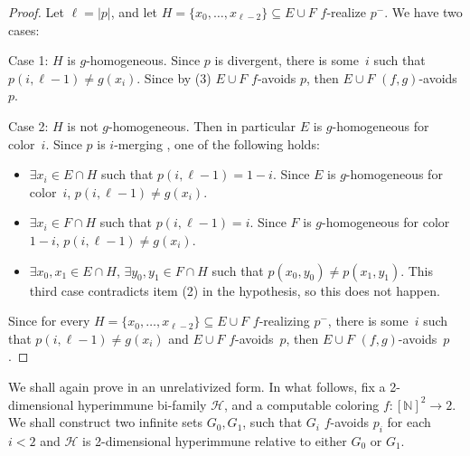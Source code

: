\documentclass{article}
\def\Hc{\mathcal{H}}
\newcommand{\NN}[0]{\mathbb{N}}
\def\NN{\mathbb{N}}
\def\Hc{\mathcal{H}}
\numberwithin{theorem}{section}
\newtheorem{lemma}[theorem]{Lemma}
\theoremstyle{definition}
\begin{document}
\begin{proof}


Let $\ell = |p|$, and let $H = \{ x_0, \dots, x_{\ell-2} \}\subseteq E \cup F$ $f$-realize $p^-$.
We have two cases:

Case 1: $H$ is $g$-homogeneous. Since $p$ is divergent, there is some~$i$ such that $p(i, \ell-1) \neq g(x_i)$. Since by (3) $E \cup F$ $f$-avoids $p$, then $E \cup F$ $(f, g)$-avoids~$p$.

Case 2: $H$ is not $g$-homogeneous. Then in particular $E$ is $g$-homogeneous for color~$i$.
Since $p$ is $i$-merging , one of the following holds:

\begin{itemize}
    \item $\exists x_i \in E \cap H$ such that $p(i, \ell-1) = 1-i$. Since $E$ is $g$-homogeneous for color~$i$, $p(i, \ell-1) \neq g(x_i)$.
    \item $\exists x_i \in F \cap H$ such that $p(i, \ell-1) = i$. Since $F$ is $g$-homogeneous for color~$1-i$, $p(i, \ell-1) \neq g(x_i)$.
    \item $\exists x_0, x_1 \in E \cap H$, $\exists y_0, y_1 \in F \cap H$ such that $p(x_0, y_0) \neq p(x_1, y_1)$.
    This third case contradicts item (2) in the hypothesis, so this does not happen.
\end{itemize}
Since for every $H  = \{ x_0, \dots, x_{\ell-2} \} \subseteq E \cup F$ $f$-realizing $p^-$, there is some~$i$ such that $p(i, \ell-1) \neq g(x_i)$ and $E \cup F$ $f$-avoids~$p$, then $E \cup F$ $(f, g)$-avoids~$p$.
\end{proof}


We shall again prove  in an unrelativized form.
In what follows, fix a 2-dimensional hyperimmune bi-family $\Hc$, and a computable coloring $f : [\NN]^2 \to 2$.
We shall construct two infinite sets $G_0, G_1$, such that
$G_i$ $f$-avoids $p_i$ for each~$i < 2$ and $\Hc$ is 2-dimensional hyperimmune relative to either $G_0$ or $G_1$.
\end{document}
